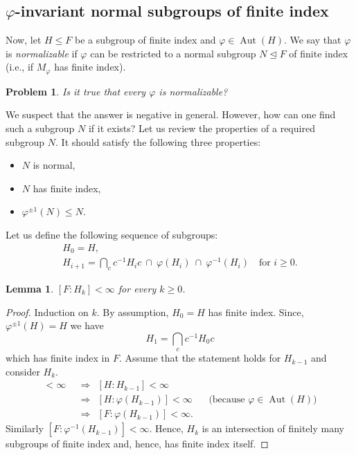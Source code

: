 \documentclass[12pt,oneside]{amsart}
\newtheorem{lemma}[theorem]{Lemma}
\newtheorem{problem}[theorem]{Problem}
\theoremstyle{definition}
\theoremstyle{case}
\DeclareMathOperator{\Aut}{{Aut}}
\begin{document}
\subsection{$\varphi$-invariant normal subgroups of finite index}
\label{se:subsectionnormalizable}

Now, let $H\le F$ be a subgroup of finite index and $\varphi\in\Aut(H)$.
We say that $\varphi$ is \emph{normalizable}
if $\varphi$ can be restricted
to a normal subgroup $N\unlhd F$ of finite index
(i.e., if $M_\varphi$ has finite index).

\begin{problem}
Is it true that every $\varphi$ is normalizable?
\end{problem}

We suspect that the answer is negative in general.
However, how can one find such a subgroup $N$ if it exists?
Let us review the properties of a required subgroup $N$.
It should satisfy the following three properties:
\begin{itemize}
\item 
$N$ is normal,
\item 
$N$ has finite index,
\item 
$\varphi^{\pm 1}(N) \leq N$.
\end{itemize}
Let us define the following sequence of subgroups:
\begin{equation}\label{eq:Hi-seq}
\begin{array}{l}
H_0=H,\\
H_{i+1}=
\bigcap_c c^{-1} H_i c 
\ \cap\ \varphi(H_i) 
\ \cap\ \varphi^{-1}(H_i)
\ \ \ \mbox{ for }i\ge 0.
\end{array}
\end{equation}

\begin{lemma}\label{le:H-k-finiteindex}
$[F:H_k]<\infty$ for every $k\ge 0$.
\end{lemma}

\begin{proof}
Induction on $k$.
By assumption, $H_0=H$ has finite index.
Since, $\varphi^{\pm 1}(H) = H$ we have
$$H_{1}=\bigcap_c c^{-1} H_0 c$$
which has finite index in $F$.
Assume that the statement holds for $H_{k-1}$ and consider $H_k$.
\begin{align*}
[F:H_{k-1}]<\infty&\ \ \Rightarrow\ \ [H:H_{k-1}]<\infty\\
&\ \ \Rightarrow\ \ [H:\varphi(H_{k-1})]<\infty
&&\mbox{(because $\varphi\in\Aut(H)$)} \\
&\ \ \Rightarrow\ \ [F:\varphi(H_{k-1})]<\infty.
\end{align*}
Similarly $[F:\varphi^{-1}(H_{k-1})]<\infty$.
Hence, $H_k$ is an intersection of finitely many subgroups
of finite index and, hence, has finite index itself.
\end{proof}
\end{document}
